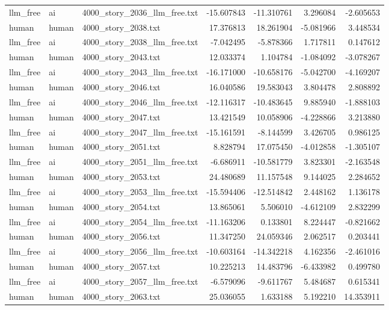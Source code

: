 \begin{longtable}{lllrrrr}
llm\_free & ai & 4000\_story\_2036\_llm\_free.txt & -15.607843 & -11.310761 & 3.296084 & -2.605653 \\
human & human & 4000\_story\_2038.txt & 17.376813 & 18.261904 & -5.081966 & 3.448534 \\
llm\_free & ai & 4000\_story\_2038\_llm\_free.txt & -7.042495 & -5.878366 & 1.717811 & 0.147612 \\
human & human & 4000\_story\_2043.txt & 12.033374 & 1.104784 & -1.084092 & -3.078267 \\
llm\_free & ai & 4000\_story\_2043\_llm\_free.txt & -16.171000 & -10.658176 & -5.042700 & -4.169207 \\
human & human & 4000\_story\_2046.txt & 16.040586 & 19.583043 & 3.804478 & 2.808892 \\
llm\_free & ai & 4000\_story\_2046\_llm\_free.txt & -12.116317 & -10.483645 & 9.885940 & -1.888103 \\
human & human & 4000\_story\_2047.txt & 13.421549 & 10.058906 & -4.228866 & 3.213880 \\
llm\_free & ai & 4000\_story\_2047\_llm\_free.txt & -15.161591 & -8.144599 & 3.426705 & 0.986125 \\
human & human & 4000\_story\_2051.txt & 8.828794 & 17.075450 & -4.012858 & -1.305107 \\
llm\_free & ai & 4000\_story\_2051\_llm\_free.txt & -6.686911 & -10.581779 & 3.823301 & -2.163548 \\
human & human & 4000\_story\_2053.txt & 24.480689 & 11.157548 & 9.144025 & 2.284652 \\
llm\_free & ai & 4000\_story\_2053\_llm\_free.txt & -15.594406 & -12.514842 & 2.448162 & 1.136178 \\
human & human & 4000\_story\_2054.txt & 13.865061 & 5.506010 & -4.612109 & 2.832299 \\
llm\_free & ai & 4000\_story\_2054\_llm\_free.txt & -11.163206 & 0.133801 & 8.224447 & -0.821662 \\
human & human & 4000\_story\_2056.txt & 11.347250 & 24.059346 & 2.062517 & 0.203441 \\
llm\_free & ai & 4000\_story\_2056\_llm\_free.txt & -10.603164 & -14.342218 & 4.162356 & -2.461016 \\
human & human & 4000\_story\_2057.txt & 10.225213 & 14.483796 & -6.433982 & 0.499780 \\
llm\_free & ai & 4000\_story\_2057\_llm\_free.txt & -6.579096 & -9.611767 & 5.484687 & 0.615341 \\
human & human & 4000\_story\_2063.txt & 25.036055 & 1.633188 & 5.192210 & 14.353911 \\

\end{longtable}
